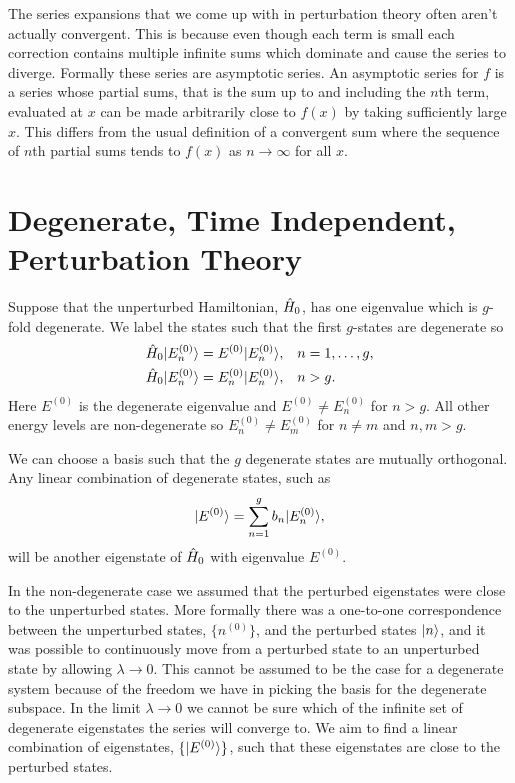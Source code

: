     The series expansions that we come up with in perturbation theory often aren't actually convergent.
    This is because even though each term is small each correction contains multiple infinite sums which dominate and cause the series to diverge.
    Formally these series are asymptotic series.
    An asymptotic series for \(f\) is a series whose partial sums, that is the sum up to and including the \(n\)th term, evaluated at \(x\) can be made arbitrarily close to \(f(x)\) by taking sufficiently large \(x\).
    This differs from the usual definition of a convergent sum where the sequence of \(n\)th partial sums tends to \(f(x)\) as \(n\to\infty\) for all \(x\).
    
    \section{Degenerate, Time Independent, Perturbation Theory} 
    Suppose that the unperturbed Hamiltonian, \(\hat{H}_0\), has one eigenvalue which is \(g\)-fold degenerate.
    We label the states such that the first \(g\)-states are degenerate so
    \begin{align*}
        \hat{H}_0\vert {E_n^{(0)}} \rangle &= E^{(0)}\vert {E_n^{(0)}} \rangle, && n = 1, \dotsc, g,\\
        \hat{H}_0\vert {E_n^{(0)}} \rangle &= E_n^{(0)}\vert {E_n^{(0)}} \rangle, && n > g.
    \end{align*}
    Here \(E^{(0)}\) is the degenerate eigenvalue and \(E^{(0)} \ne E_n^{(0)}\) for \(n > g\).
    All other energy levels are non-degenerate so \(E_n^{(0)} \ne E_m^{(0)}\) for \(n\ne m\) and \(n, m > g\).
    
    We can choose a basis such that the \(g\) degenerate states are mutually orthogonal.
    Any linear combination of degenerate states, such as
    \[\vert {E^{(0)}} \rangle = \sum_{n=1}^g b_n\vert {E_n^{(0)}} \rangle,\]
    will be another eigenstate of \(\hat{H}_0\) with eigenvalue \(E^{(0)}\).
    
    In the non-degenerate case we assumed that the perturbed eigenstates were close to the unperturbed states.
    More formally there was a one-to-one correspondence between the unperturbed states, \(\{n^{(0)}\}\), and the perturbed states \(\vert {n} \rangle\), and it was possible to continuously move from a perturbed state to an unperturbed state by allowing \(\lambda \to 0\).
    This cannot be assumed to be the case for a degenerate system because of the freedom we have in picking the basis for the degenerate subspace.
    In the limit \(\lambda \to 0\) we cannot be sure which of the infinite set of degenerate eigenstates the series will converge to.
    We aim to find a linear combination of eigenstates, \(\{\vert {E^{(0)}} \rangle\}\), such that these eigenstates are close to the perturbed states.
    
